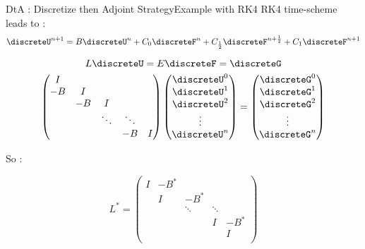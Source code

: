 \begin{frame}{DtA : Discretize then Adjoint Strategy}{Example with RK4}
\small
      RK4 time-scheme leads to :
    \begin{equation}
      \discreteU^{n+1}=B\discreteU^n+C_0\discreteF^n+C_{\frac{1}{2}}\discreteF^{n+\frac{1}{2}}+C_1\discreteF^{n+1}
    \end{equation}

\begin{equation}
  L\discreteU=E\discreteF=\discreteG
\end{equation}
\begin{equation}
  \begin{pmatrix}
    I & & & & \\
    -B&I & & & \\
    & -B&I  & & \\
    & & \ddots & \ddots   & \\
    & &  & -B &I \\
  \end{pmatrix}
  \begin{pmatrix}
    \discreteU^0 \\
    \discreteU^1 \\
    \discreteU^2 \\
    \vdots \\
    \discreteU^n \\
  \end{pmatrix}=
  \begin{pmatrix}
    \discreteG^0 \\
    \discreteG^1 \\
    \discreteG^2 \\
    \vdots \\
    \discreteG^n \\
  \end{pmatrix}
\end{equation}

So :

\begin{equation}
  L^*=\begin{pmatrix}
  I &-B^* & & & \\
  &I &-B^* & & \\
  & &\ddots  &\ddots & \\
  & &  & I   &-B^* \\
  & &  &  &I \\
  \end{pmatrix}
\end{equation}
\end{frame}





